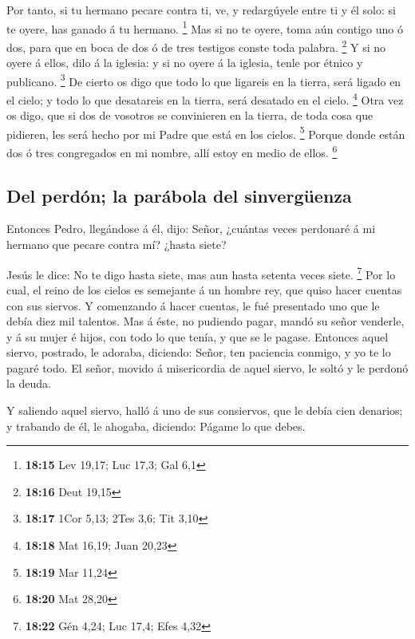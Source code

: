  Por tanto, si tu hermano pecare contra ti, ve, y
redargúyele entre ti y él solo: si te oyere, has ganado á tu hermano.
\footnote{\textbf{18:15} Lev 19,17; Luc 17,3; Gal 6,1} 
Mas si no te oyere, toma aún contigo uno ó dos, para que en boca de dos
ó de tres testigos conste toda palabra. \footnote{\textbf{18:16} Deut
  19,15}  Y si no oyere á ellos, dilo á la iglesia: y si
no oyere á la iglesia, tenle por étnico y publicano. \footnote{\textbf{18:17}
  1Cor 5,13; 2Tes 3,6; Tit 3,10}  De cierto os digo que
todo lo que ligareis en la tierra, será ligado en el cielo; y todo lo
que desatareis en la tierra, será desatado en el cielo. \footnote{\textbf{18:18}
  Mat 16,19; Juan 20,23}  Otra vez os digo, que si dos de
vosotros se convinieren en la tierra, de toda cosa que pidieren, les
será hecho por mi Padre que está en los cielos. \footnote{\textbf{18:19}
  Mar 11,24}  Porque donde están dos ó tres congregados
en mi nombre, allí estoy en medio de ellos. \footnote{\textbf{18:20} Mat
  28,20}

\hypertarget{del-perduxf3n-la-paruxe1bola-del-sinverguxfcenza}{%
\subsection{Del perdón; la parábola del
sinvergüenza}\label{del-perduxf3n-la-paruxe1bola-del-sinverguxfcenza}}

 Entonces Pedro, llegándose á él, dijo: Señor, ¿cuántas
veces perdonaré á mi hermano que pecare contra mí? ¿hasta siete?

 Jesús le dice: No te digo hasta siete, mas aun hasta
setenta veces siete. \footnote{\textbf{18:22} Gén 4,24; Luc 17,4; Efes
  4,32}  Por lo cual, el reino de los cielos es semejante
á un hombre rey, que quiso hacer cuentas con sus siervos.
 Y comenzando á hacer cuentas, le fué presentado uno que
le debía diez mil talentos.  Mas á éste, no pudiendo
pagar, mandó su señor venderle, y á su mujer é hijos, con todo lo que
tenía, y que se le pagase.  Entonces aquel siervo,
postrado, le adoraba, diciendo: Señor, ten paciencia conmigo, y yo te lo
pagaré todo.  El señor, movido á misericordia de aquel
siervo, le soltó y le perdonó la deuda.

 Y saliendo aquel siervo, halló á uno de sus consiervos,
que le debía cien denarios; y trabando de él, le ahogaba, diciendo:
Págame lo que debes.

